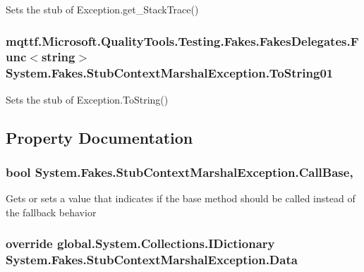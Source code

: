 Sets the stub of Exception.\-get\-\_\-\-Stack\-Trace()

\hypertarget{class_system_1_1_fakes_1_1_stub_context_marshal_exception_a4c62539c00e22c61e7329e328dd33c5d}{
\subsubsection[{To\-String01}]{\setlength{\rightskip}{0pt plus 5cm}mqttf.\-Microsoft.\-Quality\-Tools.\-Testing.\-Fakes.\-Fakes\-Delegates.\-Func$<$string$>$ System.\-Fakes.\-Stub\-Context\-Marshal\-Exception.\-To\-String01}}\label{class_system_1_1_fakes_1_1_stub_context_marshal_exception_a4c62539c00e22c61e7329e328dd33c5d}


Sets the stub of Exception.\-To\-String()



\subsection{Property Documentation}
\hypertarget{class_system_1_1_fakes_1_1_stub_context_marshal_exception_abc5c0b52f55613b9abd82e62661ed1f0}{
\subsubsection[{Call\-Base}]{\setlength{\rightskip}{0pt plus 5cm}bool System.\-Fakes.\-Stub\-Context\-Marshal\-Exception.\-Call\-Base\hspace{0.3cm}{\ttfamily [get]}, {\ttfamily [set]}}}\label{class_system_1_1_fakes_1_1_stub_context_marshal_exception_abc5c0b52f55613b9abd82e62661ed1f0}


Gets or sets a value that indicates if the base method should be called instead of the fallback behavior

\hypertarget{class_system_1_1_fakes_1_1_stub_context_marshal_exception_af2017eb85b8d5cece233d7304dbfde59}{
\subsubsection[{Data}]{\setlength{\rightskip}{0pt plus 5cm}override global.\-System.\-Collections.\-I\-Dictionary System.\-Fakes.\-Stub\-Context\-Marshal\-Exception.\-Data\hspace{0.3cm}{\ttfamily [get]}}}\label{class_system_1_1_fakes_1_1_stub_context_marshal_exception_af2017eb85b8d5cece233d7304dbfde59}


